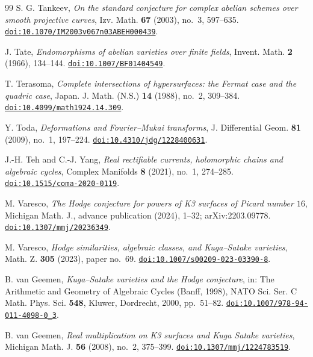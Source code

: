 \documentclass[11pt,reqno]{amsart}
\theoremstyle{plain}
\theoremstyle{definition}
\theoremstyle{remark}
\begin{document}
\begin{thebibliography}{99}
S. G. Tankeev,
\emph{On the standard conjecture for complex abelian schemes over smooth
projective curves},
Izv. Math. \textbf{67} (2003), no.~3, 597--635.
\href{https://doi.org/10.1070/IM2003v067n03ABEH000439}{\texttt{doi:10.1070/IM2003v067n03ABEH000439}}.

J. Tate,
\emph{Endomorphisms of abelian varieties over finite fields},
Invent. Math. \textbf{2} (1966), 134--144.
\href{https://doi.org/10.1007/BF01404549}{\texttt{doi:10.1007/BF01404549}}.

T. Terasoma,
\emph{Complete intersections of hypersurfaces: the Fermat case and the
quadric case},
Japan. J. Math. (N.S.) \textbf{14} (1988), no.~2, 309--384.
\href{https://doi.org/10.4099/math1924.14.309}{\texttt{doi:10.4099/math1924.14.309}}.

Y. Toda,
\emph{Deformations and Fourier--Mukai transforms},
J. Differential Geom. \textbf{81} (2009), no.~1, 197--224.
\href{https://doi.org/10.4310/jdg/1228400631}{\texttt{doi:10.4310/jdg/1228400631}}.

J.-H. Teh and C.-J. Yang,
\emph{Real rectifiable currents, holomorphic chains and algebraic cycles},
Complex Manifolds \textbf{8} (2021), no.~1, 274--285.
\href{https://doi.org/10.1515/coma-2020-0119}{\texttt{doi:10.1515/coma-2020-0119}}.

M. Varesco,
\emph{The Hodge conjecture for powers of K3 surfaces of Picard number $16$},
Michigan Math. J., advance publication (2024), 1--32; arXiv:2203.09778.
\href{https://doi.org/10.1307/mmj/20236349}{\texttt{doi:10.1307/mmj/20236349}}.

M. Varesco,
\emph{Hodge similarities, algebraic classes, and Kuga--Satake varieties},
Math. Z. \textbf{305} (2023), paper no.~69.
\href{https://doi.org/10.1007/s00209-023-03390-8}{\texttt{doi:10.1007/s00209-023-03390-8}}.

B. van Geemen,
\emph{Kuga--Satake varieties and the Hodge conjecture},
in: The Arithmetic and Geometry of Algebraic Cycles (Banff, 1998),
NATO Sci. Ser. C Math. Phys. Sci. \textbf{548},
Kluwer, Dordrecht, 2000, pp.~51--82.
\href{https://doi.org/10.1007/978-94-011-4098-0_3}{\texttt{doi:10.1007/978-94-011-4098-0\_3}}.

B. van Geemen,
\emph{Real multiplication on K3 surfaces and Kuga Satake varieties},
Michigan Math. J. \textbf{56} (2008), no.~2, 375--399.
\href{https://doi.org/10.1307/mmj/1224783519}{\texttt{doi:10.1307/mmj/1224783519}}.


\end{thebibliography}
\end{document}
